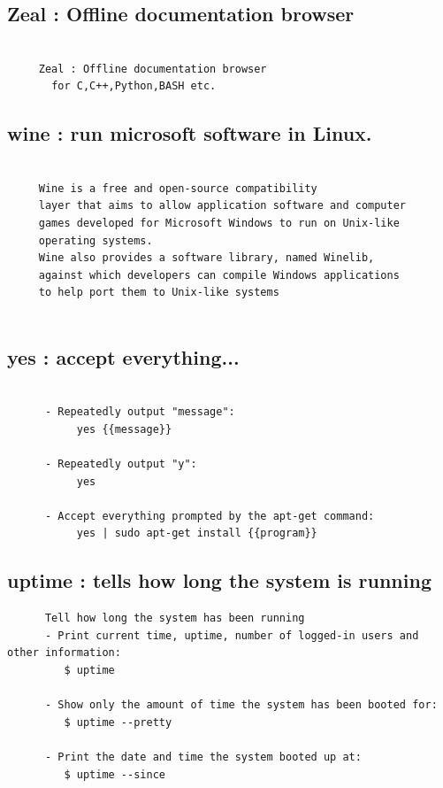 \documentclass[a4paper,12pt]{article}
\begin{document}
\subsection{Zeal : Offline documentation browser}
\begin{verbatim}

     Zeal : Offline documentation browser
       for C,C++,Python,BASH etc.

\end{verbatim}

\subsection{wine     : run microsoft software in Linux. }
\begin{verbatim}

     Wine is a free and open-source compatibility
     layer that aims to allow application software and computer
     games developed for Microsoft Windows to run on Unix-like
     operating systems. 
     Wine also provides a software library, named Winelib,
     against which developers can compile Windows applications
     to help port them to Unix-like systems


\end{verbatim}


\subsection{yes     : accept everything... }
\begin{verbatim}

      - Repeatedly output "message":
           yes {{message}}

      - Repeatedly output "y":
           yes

      - Accept everything prompted by the apt-get command:
           yes | sudo apt-get install {{program}}

\end{verbatim}


\subsection{uptime     : tells how long the system is running }
\begin{verbatim}
      Tell how long the system has been running
      - Print current time, uptime, number of logged-in users and other information:
         $ uptime

      - Show only the amount of time the system has been booted for:
         $ uptime --pretty

      - Print the date and time the system booted up at:
         $ uptime --since
\end{verbatim}
\end{document}

